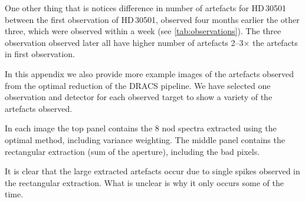 One other thing that is notices difference in number of artefacts for HD\,30501 between the first observation of HD\,30501, observed four months earlier the other three, which were observed within a week (see \cref{tab:observations}). The three observation observed later all have higher number of artefacts 2--3$\times$ the artefacts in first observation. 

In this appendix we also provide more example images of the artefacts observed from the optimal reduction of the {DRACS} pipeline.
We have selected one observation and detector for each observed target to show a variety of the artefacts observed.

In each image the top panel contains the 8 nod spectra extracted using the optimal method, including variance weighting.
The middle panel contains the rectangular extraction (sum of the aperture), including the bad pixels.

It is clear that the large extracted artefacts occur due to single spikes observed in the rectangular extraction.
What is unclear is why it only occurs some of the time.




